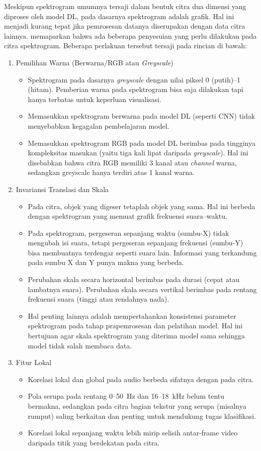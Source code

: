 Meskipun spektrogram umumnya tersaji dalam bentuk citra dua dimensi yang diproses oleh model DL, pada dasarnya spektrogram adalah grafik. Hal ini menjadi kurang tepat jika pemrosesan datanya diserupakan dengan data citra lainnya. \autocite{app16020572} memaparkan bahwa ada beberapa penyesuian yang perlu dilakukan pada citra spektrogram. Beberapa perlakuan tersebut tersaji pada rincian di bawah:
\begin{enumerate}
  \item Pemilihan Warna (Berwarna/RGB atau \textit{Greyscale})
  \begin{itemize}
    \item Spektrogram pada dasarnya \textit{greyscale} dengan nilai piksel 0 (putih)--1 (hitam). Pemberian warna pada spektrogram bisa saja dilakukan tapi hanya terbatas untuk keperluan visualisasi.
    \item Memasukkan spektrogram berwarna pada model DL (seperti CNN) tidak menyebabkan kegagalan pembelajaran model.
    \item Memasukkan spektrogram RGB pada model DL berimbas pada tingginya kompleksitas masukan (yaitu tiga kali lipat daripada \textit{greyscale}). Hal ini disebabkan bahwa citra RGB memiliki 3 kanal atau \textit{channel} warna, sedangkan greyscale hanya terdiri atas 1 kanal warna.
  \end{itemize}
  \item Invariansi Translasi dan Skala
  \begin{itemize}
    \item Pada citra, objek yang digeser tetaplah objek yang sama. Hal ini berbeda dengan spektrogram yang memuat grafik frekuensi suara--waktu.
    \item Pada spektrogram, pergeseran sepanjang waktu (sumbu-X) tidak mengubah isi suara, tetapi pergeseran sepanjang frekuensi (sumbu-Y) bisa membuatnya terdengar seperti suara lain. Informasi yang terkandung pada sumbu X dan Y punya makna yang berbeda.
    \item Perubahan skala secara horizontal berimbas pada durasi (cepat atau lambatnya suara). Perubahan skala secara vertikal berimbas pada rentang frekuensi suara (tinggi atau rendahnya nada).
    \item Hal penting lainnya adalah mempertahankan konsistensi parameter spektrogram pada tahap prapemrosesan dan pelatihan model. Hal ini bertujuan agar skala spektrogram yang diterima model sama sehingga model tidak salah membaca data.
  \end{itemize}
  \item Fitur Lokal
  \begin{itemize}
    \item Korelasi lokal dan global pada audio berbeda sifatnya dengan pada citra.
    \item Pola serupa pada rentang 0--50~Hz dan 16--18~kHz belum tentu bermakna, sedangkan pada citra bagian tekstur yang serupa (misalnya rumput) saling berkaitan dan penting untuk mendukung tugas klasifikasi.
    \item Korelasi lokal sepanjang waktu lebih mirip selisih antar-frame video daripada titik yang berdekatan pada citra.
  \end{itemize}
\end{enumerate}

